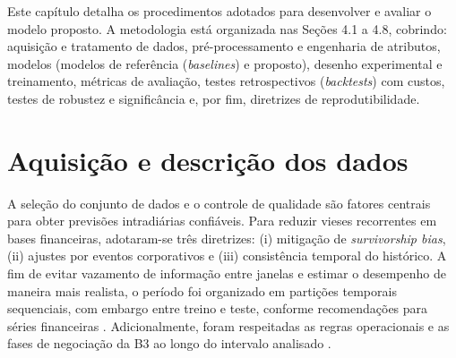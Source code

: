 Este capítulo detalha os procedimentos adotados para desenvolver e avaliar o modelo proposto. A metodologia está organizada nas Seções 4.1 a 4.8, cobrindo: aquisição e tratamento de dados, pré-processamento e engenharia de atributos, modelos (modelos de referência (\textit{baselines}) e proposto), desenho experimental e treinamento, métricas de avaliação, testes retrospectivos (\textit{backtests}) com custos, testes de robustez e significância e, por fim, diretrizes de reprodutibilidade.

\section{Aquisição e descrição dos dados}

A seleção do conjunto de dados e o controle de qualidade são fatores centrais para obter previsões intradiárias confiáveis. Para reduzir vieses recorrentes em bases financeiras, adotaram-se três diretrizes: (i) mitigação de \emph{survivorship bias}, (ii) ajustes por eventos corporativos e (iii) consistência temporal do histórico. A fim de evitar vazamento de informação entre janelas e estimar o desempenho de maneira mais realista, o período foi organizado em partições temporais sequenciais, com embargo entre treino e teste, conforme recomendações para séries financeiras \cite{lopezdeprado2018,bergmeir2012}. Adicionalmente, foram respeitadas as regras operacionais e as fases de negociação da B3 ao longo do intervalo analisado \cite{b3_manual_negociacao}.

